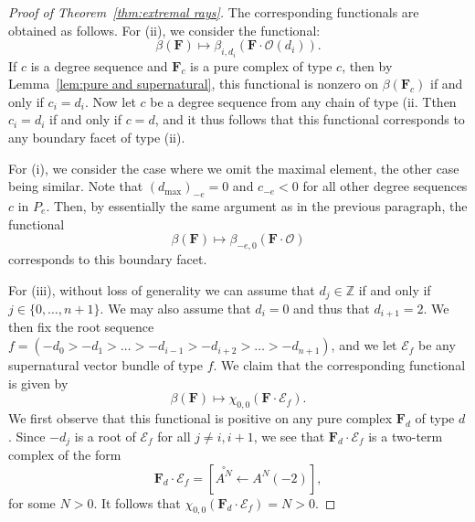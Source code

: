 \documentclass[12pt]{amsart}
\theoremstyle{definition}
\theoremstyle{remark}
\newcommand{\ZZ}{\mathbb{Z}}
\newcommand{\cO}{\mathcal{O}}
\newcommand{\cE}{\mathcal{E}}
\newcommand{\FF}{\mathbf{F}}
\begin{document}
\begin{proof}[Proof of Theorem~\ref{thm:extremal rays}]
The corresponding functionals are obtained as follows.  For (ii), we consider the functional:
\[
\beta(\FF)\mapsto \beta_{i,{d_i}}(\FF\cdot \cO(d_i)).
\]
If $c$ is a degree sequence and $\FF_c$ is a pure complex of type $c$, then by Lemma~\ref{lem:pure and supernatural}, this functional is nonzero on $\beta(\FF_c)$ if and only if $c_i=d_i$.
Now let $c$ be a degree sequence from any chain of type (ii.  Tthen $c_i=d_i$ if and only if $c=d$, and it thus follows that this functional corresponds to any boundary facet of type (ii).

For (i), we consider the case where we omit the maximal element, the other case being similar.  Note that $(d_{\max})_{-e}=0$ and $c_{-e}<0$ for all other degree sequences $c$ in $P_e$.  Then, by essentially the same argument as in the previous paragraph, the functional 
\[
\beta(\FF)\mapsto \beta_{-e,0}(\FF\cdot \cO)
\]
corresponds to this boundary facet.


For (iii), without loss of generality we can assume that $d_j\in \ZZ$ if and only if $j\in \{0, \dots, n+1\}$.   We may also assume that $d_i=0$ and thus that $d_{i+1}=2$.  We then fix the root sequence $f=(-d_0>-d_1>\dots >-d_{i-1}>-d_{i+2}>\dots >-d_{n+1})$, and we let $\cE_f$ be any supernatural vector bundle of type $f$.  We claim that the corresponding functional is given by
\[
\beta(\FF) \mapsto \chi_{0,0}(\FF\cdot \cE_f).
\]
We first observe that this functional is positive on any pure complex $\FF_d$ of type $d$.  Since $-d_j$ is a root of $\cE_f$ for all $j\ne i,i+1$, we see that $\FF_d\cdot \cE_f$ is a two-term complex of the form
\[
\FF_d\cdot \cE_f=\left[ \overset{\circ}{A^N} \gets A^N(-2)\right],
\]
for some $N>0$.  It follows that $\chi_{0,0}(\FF_d\cdot \cE_f)=N>0$.  


\end{proof}
\end{document}
